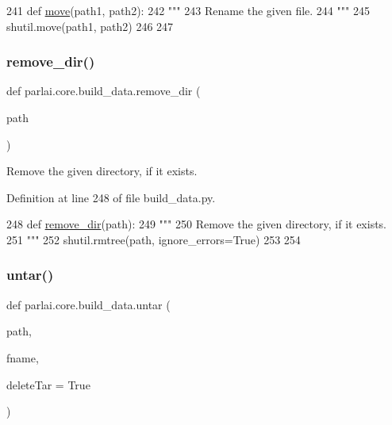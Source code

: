 \begin{DoxyCode}
241 \textcolor{keyword}{def }\hyperlink{namespaceparlai_1_1core_1_1build__data_a1678b8a042eeb9d9c8e9de08f52e496b}{move}(path1, path2):
242     \textcolor{stringliteral}{"""}
243 \textcolor{stringliteral}{    Rename the given file.}
244 \textcolor{stringliteral}{    """}
245     shutil.move(path1, path2)
246 
247 
\end{DoxyCode}
\mbox{\label{namespaceparlai_1_1core_1_1build__data_a24ab3b7e68e41adf774df058d330ff33}} 
\subsubsection{\texorpdfstring{remove\+\_\+dir()}{remove\_dir()}}
{\footnotesize\ttfamily def parlai.\+core.\+build\+\_\+data.\+remove\+\_\+dir (\begin{DoxyParamCaption}\item[{}]{path }\end{DoxyParamCaption})}

\begin{DoxyVerb}Remove the given directory, if it exists.
\end{DoxyVerb}
 

Definition at line 248 of file build\+\_\+data.\+py.


\begin{DoxyCode}
248 \textcolor{keyword}{def }\hyperlink{namespaceparlai_1_1core_1_1build__data_a24ab3b7e68e41adf774df058d330ff33}{remove\_dir}(path):
249     \textcolor{stringliteral}{"""}
250 \textcolor{stringliteral}{    Remove the given directory, if it exists.}
251 \textcolor{stringliteral}{    """}
252     shutil.rmtree(path, ignore\_errors=\textcolor{keyword}{True})
253 
254 
\end{DoxyCode}
\mbox{\label{namespaceparlai_1_1core_1_1build__data_a4d33f97932682a8513904022d852f3cf}} 
\subsubsection{\texorpdfstring{untar()}{untar()}}
{\footnotesize\ttfamily def parlai.\+core.\+build\+\_\+data.\+untar (\begin{DoxyParamCaption}\item[{}]{path,  }\item[{}]{fname,  }\item[{}]{delete\+Tar = {\ttfamily True} }\end{DoxyParamCaption})}

